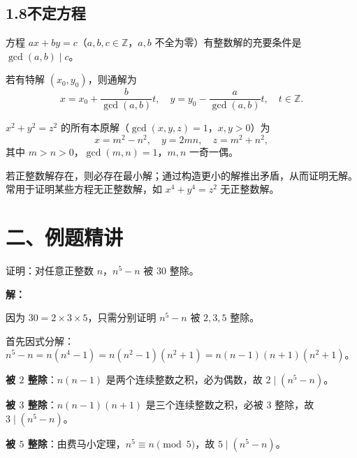 \documentclass[12pt, a4paper]{ctexart}
\begin{document}
\subsection*{1.8\quad 不定方程}

\begin{knowledgebox}[二元一次不定方程]
方程 $ax + by = c$（$a, b, c \in \mathbb{Z}$，$a, b$ 不全为零）有整数解的充要条件是 $\gcd(a, b) \mid c$。

若有特解 $(x_0, y_0)$，则通解为
\[ x = x_0 + \frac{b}{\gcd(a, b)} t, \quad y = y_0 - \frac{a}{\gcd(a, b)} t, \quad t \in \mathbb{Z}. \]
\end{knowledgebox}

\begin{knowledgebox}[勾股方程]
$x^2 + y^2 = z^2$ 的所有本原解（$\gcd(x, y, z) = 1$，$x, y > 0$）为
\[ x = m^2 - n^2, \quad y = 2mn, \quad z = m^2 + n^2, \]
其中 $m > n > 0$，$\gcd(m, n) = 1$，$m, n$ 一奇一偶。
\end{knowledgebox}

\begin{knowledgebox}[费马无穷递降法]
若正整数解存在，则必存在最小解；通过构造更小的解推出矛盾，从而证明无解。
常用于证明某些方程无正整数解，如 $x^4 + y^4 = z^2$ 无正整数解。
\end{knowledgebox}

\section*{\textcolor{examorange}{二、例题精讲}}

\begin{examplebox}[【例题1】整除的判定]
证明：对任意正整数 $n$，$n^5 - n$ 被 $30$ 整除。
\end{examplebox}

\textbf{解：}

因为 $30 = 2 \times 3 \times 5$，只需分别证明 $n^5 - n$ 被 $2, 3, 5$ 整除。

首先因式分解：$n^5 - n = n(n^4 - 1) = n(n^2 - 1)(n^2 + 1) = n(n-1)(n+1)(n^2+1)$。

\textbf{被 $2$ 整除}：$n(n-1)$ 是两个连续整数之积，必为偶数，故 $2 \mid (n^5 - n)$。

\textbf{被 $3$ 整除}：$n(n-1)(n+1)$ 是三个连续整数之积，必被 $3$ 整除，故 $3 \mid (n^5 - n)$。

\textbf{被 $5$ 整除}：由费马小定理，$n^5 \equiv n \pmod{5}$，故 $5 \mid (n^5 - n)$。
\end{document}
